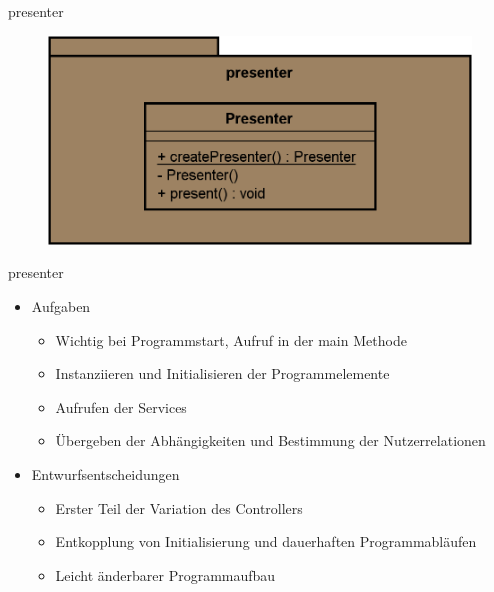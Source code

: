 \begin{frame}{presenter}
  \begin{figure}
    \centering
    \includegraphics[width=\textwidth]{./images/presenter.png}
  \end{figure}
\end{frame}

\begin{frame}{presenter}
  \begin{itemize}[<+->]
    \item Aufgaben
      \begin{itemize}
        \item Wichtig bei Programmstart, Aufruf in der main Methode
        \item Instanziieren und Initialisieren der Programmelemente
        \item Aufrufen der Services
        \item Übergeben der Abhängigkeiten und Bestimmung der Nutzerrelationen
      \end{itemize}
      \item Entwurfsentscheidungen
        \begin{itemize}
          \item Erster Teil der Variation des Controllers
          \item Entkopplung von Initialisierung und dauerhaften Programmabläufen
          \item Leicht änderbarer Programmaufbau
        \end{itemize}
  \end{itemize}
\end{frame}